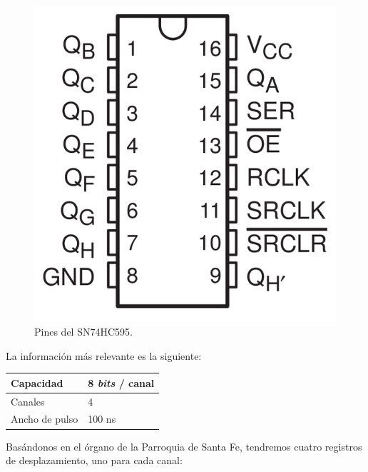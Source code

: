 \begin{figure}[H]
	\noindent \begin{centering}
		\includegraphics[width=\linewidth/4]{capitulo3/SN74HC595}
		\par\end{centering}
	\smallskip
	\caption{\label{fig:SN74HC595} Pines del SN74HC595. }
\end{figure} 

\smallskip

La información más relevante es la siguiente:

\smallskip

\begin{center}
		\begin{tabular}{|l|l|}
		\hline Capacidad & 8 \textit{bits} / canal \\ 
		\hline Canales & 4 \\ 
		\hline Ancho de pulso & 100 ns \\ 
		\hline 
	\end{tabular}
	\smallskip
\end{center}

\smallskip

Basándonos en el órgano de la Parroquia de Santa Fe, tendremos cuatro registros de desplazamiento, uno para cada canal:

